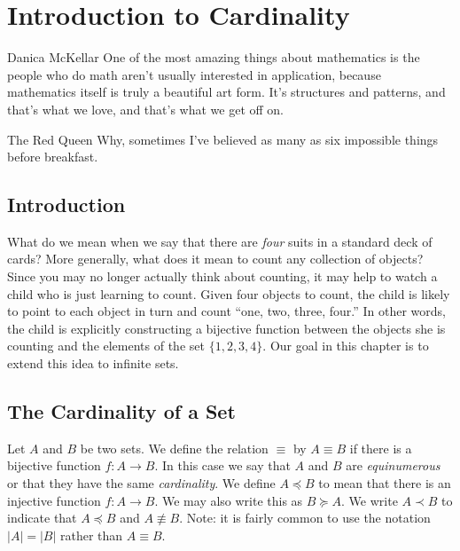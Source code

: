 \chapter{Introduction to Cardinality}

\begin{chapqt}{Danica McKellar}
One of the most amazing things about mathematics is the people who do math aren't usually interested in application, because mathematics itself is truly a beautiful art form. It's structures and patterns, and that's what we love, and that's what we get off on.
\end{chapqt}

\begin{chapqt}{The Red Queen}
Why, sometimes I've believed as many as six impossible things before breakfast.
\end{chapqt}

\section*{Introduction}

What do we mean when we say that there are \emph{four} suits in a standard deck of cards?  More generally, what does it mean to count any collection of objects?  Since you may no longer actually think about counting, it may help to watch a child who is just learning to count. Given four objects to count, the child is likely to point to each object in turn and count ``one, two, three, four.''  In other words, the child is explicitly constructing a bijective function between the objects she is counting and the elements of the set $\{1,2,3,4\}$.  Our goal in this chapter is to extend this idea to infinite sets.

\section{The Cardinality of a Set}

Let $A$ and $B$ be two sets.  We define the relation $\equiv$ by $A\equiv B$ if there is a bijective function $f:A\to B$.  In this case we say that $A$ and $B$ are \emph{equinumerous}  or that they have the same \emph{cardinality}. We define $A\preceq B$ to mean that there is an injective function $f:A\to B$.  We may also write this as $B\succeq A$. We write $A\prec B$ to indicate that $A\preceq B$ and $A\not\equiv B$. Note: it is fairly common to use the notation $|A|=|B|$ rather than $A\equiv B$.


